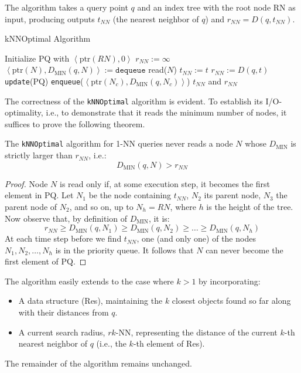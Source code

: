 The algorithm takes a query point $q$ and an index tree with the root node RN as input, producing outputs $t_{NN}$ (the nearest neighbor of $q$) and $r_{NN}=D(q,t_{NN})$.
\begin{algorithm}[H]
    \caption{kNNOptimal Algorithm}
        \begin{algorithmic}[1]
            \State Initialize PQ with $\left\langle \text{ptr}(RN),0 \right\rangle $
            \State $r_{NN}:=\infty$
                \State $\left\langle \text{ptr}(N),D_{\text{MIN}}(q,N) \right\rangle := \texttt{dequeue}$
                \State read($N$)
                            \State $t_{NN} := t$
                            \State $r_{NN} := D(q,t)$
                            \State \texttt{update}(PQ)
                        \EndIf
                    \EndFor
                \Else 
                            \State \texttt{enqueue}($\left\langle \text{ptr}(N_c),D_{\text{MIN}}(q,N_c) \right\rangle$)
                        \EndIf 
                    \EndFor
                \EndIf
            \EndWhile 
            \State \Return $t_{NN}$ and $r_{NN}$
        \end{algorithmic}
\end{algorithm}
The correctness of the \texttt{kNNOptimal} algorithm is evident. 
To establish its I/O-optimality, i.e., to demonstrate that it reads the minimum number of nodes, it suffices to prove the following theorem.
\begin{theorem}
    The \texttt{kNNOptimal} algorithm for 1-NN queries never reads a node $N$ whose $D_{\text{MIN}}$ is strictly larger than $r_{NN}$, i.e.: 
    \[D_{\text{MIN}}(q,N) > r_{NN}\]
\end{theorem}
\begin{proof}
    Node $N$ is read only if, at some execution step, it becomes the first element in PQ. 
    Let $N_1$ be the node containing $t_{NN}$, $N_2$ its parent node, $N_3$ the parent node of $N_2$, and so on, up to $N_h = RN$, where $h$ is the height of the tree.
    Now observe that, by definition of $D_{\text{MIN}}$, it is:
    \[r_{NN} \geq D_{\text{MIN}}(q,N_1) \geq D_{\text{MIN}}(q,N_2) \geq \dots \geq D_{\text{MIN}}(q,N_h)\]
    At each time step before we find $t_{NN}$, one (and only one) of the nodes $N_1, N_2, \dots, N_h$ is in the priority queue. 
    It follows that $N$ can never become the first element of PQ.
\end{proof}
The algorithm easily extends to the case where $k > 1$ by incorporating:
\begin{itemize}
    \item A data structure (Res), maintaining the $k$ closest objects found so far along with their distances from $q$.
    \item A current search radius, $rk$-NN, representing the distance of the current $k$-th nearest neighbor of $q$ (i.e., the $k$-th element of Res).
\end{itemize}
The remainder of the algorithm remains unchanged.

